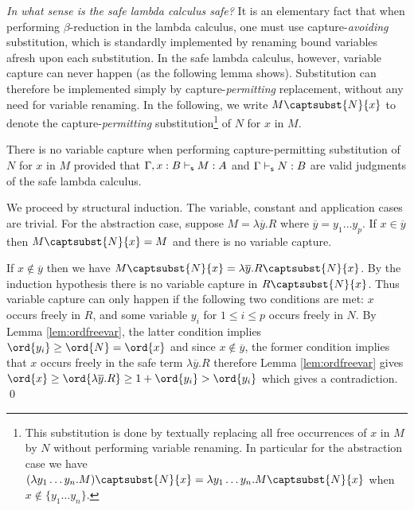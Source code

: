 
\emph{In what sense is the safe lambda calculus safe?} It is an
elementary fact that when performing $\beta$-reduction in the lambda
calculus, one must use capture-\emph{avoiding} substitution, which
is standardly implemented by renaming bound variables afresh upon
each substitution. In the safe lambda calculus, however, variable
capture can never happen (as the following lemma shows).
Substitution can therefore be implemented simply by
capture-\emph{permitting} replacement, without any need for variable
renaming. In the following, we write $M\captsubst{N}{x}$ to denote
the capture-\emph{permitting} substitution\footnote{This
substitution is done by textually replacing all free occurrences of
$x$ in $M$ by $N$ without performing variable renaming.  In
particular for the abstraction
  case we have
$(\lambda y_1\ldots y_n . M)\captsubst{N}{x} = \lambda y_1\ldots y_n . M\captsubst{N}{x}$ when $x\not\in
  \{ y_1\ldots y_n \}$.}
of $N$ for $x$ in $M$.

\begin{lemma}\label{lem:nvc}
\label{lem:homog_nocapture} There is
no variable capture when performing capture-permitting
substitution of $N$ for $x$ in $M$
provided that $\Gamma, x:B \vdash_{\sf s} M : A$ and $\Gamma \vdash_{\sf s}  N : B$ are valid judgments of the safe lambda calculus.
\end{lemma}

\proof
  We proceed by structural induction. The variable, constant and
  application cases are trivial. For the abstraction case, suppose $M = \lambda \overline{y}. R$ where $\overline{y} = y_1
  \ldots y_p$. If $x \in \overline{y}$ then $M \captsubst{N}{x} = M$ and there is no variable capture.

 If $x \not\in \overline{y}$ then we have $M \captsubst{N}{x} = \lambda \overline{y} . R \captsubst{N}{x}$.  By the induction hypothesis there is no variable capture in $R \captsubst{N}{x}$.  Thus variable capture can only happen if the following two conditions are met: $x$ occurs freely in $R$, and some variable $y_i$ for $1 \leq i \leq p$ occurs freely in $N$. By Lemma \ref{lem:ordfreevar}, the latter condition  implies $\ord{y_i} \geq \ord{N} = \ord{x}$ and  since $x \not \in \overline{y}$, the former condition implies that $x$ occurs freely in the safe term $\lambda \overline{y}. R$
  therefore Lemma \ref{lem:ordfreevar} gives $ \ord{x} \geq
  \ord{\lambda \overline{y} . R} \geq 1+ \ord{y_i} > \ord{y_i}$ which  gives a contradiction.
\qed


